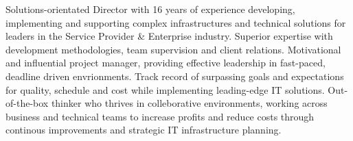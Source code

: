 

\begin{cvparagraph}

	Solutions-orientated Director with 16 years of experience developing, implementing and supporting complex infrastructures and technical
	solutions for leaders in the Service Provider \& Enterprise industry. Superior expertise with development methodologies, team 
	supervision and client relations. Motivational and influential project manager, providing effective leadership in fast-paced, 
	deadline driven envrionments. Track record of surpassing goals and expectations for quality, schedule and cost while implementing 
	leading-edge IT solutions. Out-of-the-box thinker who thrives in colleborative environments, working across business and technical 
	teams to increase profits and reduce costs through continous improvements and strategic IT infrastructure planning.
\end{cvparagraph}
